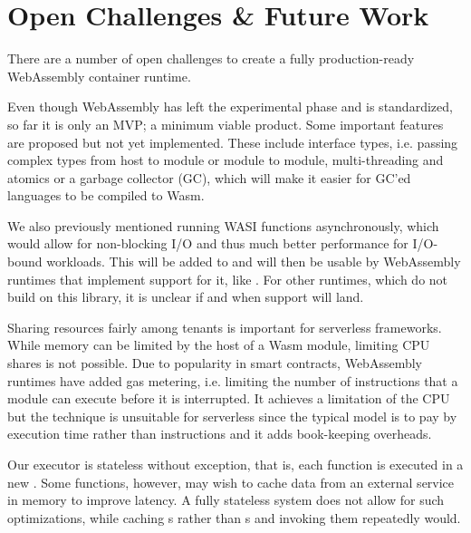 

\section{Open Challenges \& Future Work}

There are a number of open challenges to create a fully production-ready WebAssembly container runtime.

Even though WebAssembly has left the experimental phase and is standardized, so far it is only an MVP; a minimum viable product. Some important features are proposed but not yet implemented. These include interface types, i.e. passing complex types from host to module or module to module, multi-threading and atomics or a garbage collector (GC), which will make it easier for GC'ed languages to be compiled to Wasm.

We also previously mentioned running WASI functions asynchronously, which would allow for non-blocking I/O and thus much better performance for I/O-bound workloads. This will be added to  and will then be usable by WebAssembly runtimes that implement support for it, like . For other runtimes, which do not build on this library, it is unclear if and when support will land.

Sharing resources fairly among tenants is important for serverless frameworks. While memory can be limited by the host of a Wasm module, limiting CPU shares is not possible. Due to popularity in smart contracts, WebAssembly runtimes have added gas metering, i.e. limiting the number of instructions that a module can execute before it is interrupted. It achieves a limitation of the CPU but the technique is unsuitable for serverless since the typical model is to pay by execution time rather than instructions and it adds book-keeping overheads.

Our executor is stateless without exception, that is, each function is executed in a new . Some functions, however, may wish to cache data from an external service in memory to improve latency. A fully stateless system does not allow for such optimizations, while caching s rather than s and invoking them repeatedly would.

